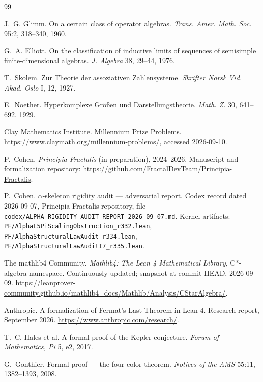 \documentclass[11pt,a4paper]{article}
\theoremstyle{plain}
\theoremstyle{definition}
\begin{document}
\begin{thebibliography}{99}

J.~G. Glimm.
\newblock On a certain class of operator algebras.
\newblock \emph{Trans. Amer. Math. Soc.} 95:2, 318--340, 1960.

G.~A. Elliott.
\newblock On the classification of inductive limits of sequences of semisimple finite-dimensional algebras.
\newblock \emph{J. Algebra} 38, 29--44, 1976.

T.~Skolem.
\newblock Zur Theorie der assoziativen Zahlensysteme.
\newblock \emph{Skrifter Norsk Vid. Akad. Oslo} I, 12, 1927.

E.~Noether.
\newblock Hyperkomplexe Gr\"o\ss{}en und Darstellungstheorie.
\newblock \emph{Math. Z.} 30, 641--692, 1929.

Clay Mathematics Institute.
\newblock Millennium Prize Problems.
\newblock \url{https://www.claymath.org/millennium-problems/}, accessed 2026-09-10.

P.~Cohen.
\newblock \emph{Principia Fractalis} (in preparation), 2024--2026.
\newblock Manuscript and formalization repository: \url{https://github.com/FractalDevTeam/Principia-Fractalis}.

P.~Cohen.
\newblock $\alpha$-skeleton rigidity audit --- adversarial report.
\newblock Codex record dated 2026-09-07, Principia Fractalis repository, file \texttt{codex/ALPHA\_RIGIDITY\_AUDIT\_REPORT\_2026-09-07.md}.
\newblock Kernel artifacts: \texttt{PF/AlphaL5PiScalingObstruction\_r332.lean}, \texttt{PF/AlphaStructuralLawAudit\_r334.lean}, \texttt{PF/AlphaStructuralLawAuditI7\_r335.lean}.

The mathlib4 Community.
\newblock \emph{Mathlib4: The Lean 4 Mathematical Library}, C*-algebra namespace.
\newblock Continuously updated; snapshot at commit HEAD, 2026-09-09.
\newblock \url{https://leanprover-community.github.io/mathlib4_docs/Mathlib/Analysis/CStarAlgebra/}.

Anthropic.
\newblock A formalization of Fermat's Last Theorem in Lean 4.
\newblock Research report, September 2026.
\newblock \url{https://www.anthropic.com/research/}.

T.~C. Hales et al.
\newblock A formal proof of the Kepler conjecture.
\newblock \emph{Forum of Mathematics, Pi} 5, e2, 2017.

G.~Gonthier.
\newblock Formal proof --- the four-color theorem.
\newblock \emph{Notices of the AMS} 55:11, 1382--1393, 2008.

\end{thebibliography}
\end{document}
